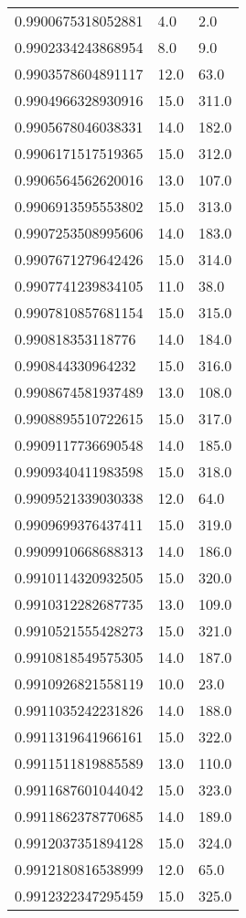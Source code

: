 \begin{center}
\begin{supertabular}[H]{p{0.30\textwidth}p{0.05\textwidth}p{0.05\textwidth}}
0.9900675318052881 & 4.0 & 2.0 \\ 
0.9902334243868954 & 8.0 & 9.0 \\ 
0.9903578604891117 & 12.0 & 63.0 \\ 
0.9904966328930916 & 15.0 & 311.0 \\ 
0.9905678046038331 & 14.0 & 182.0 \\ 
0.9906171517519365 & 15.0 & 312.0 \\ 
0.9906564562620016 & 13.0 & 107.0 \\ 
0.9906913595553802 & 15.0 & 313.0 \\ 
0.9907253508995606 & 14.0 & 183.0 \\ 
0.9907671279642426 & 15.0 & 314.0 \\ 
0.9907741239834105 & 11.0 & 38.0 \\ 
0.9907810857681154 & 15.0 & 315.0 \\ 
0.990818353118776 & 14.0 & 184.0 \\ 
0.990844330964232 & 15.0 & 316.0 \\ 
0.9908674581937489 & 13.0 & 108.0 \\ 
0.9908895510722615 & 15.0 & 317.0 \\ 
0.9909117736690548 & 14.0 & 185.0 \\ 
0.9909340411983598 & 15.0 & 318.0 \\ 
0.9909521339030338 & 12.0 & 64.0 \\ 
0.9909699376437411 & 15.0 & 319.0 \\ 
0.9909910668688313 & 14.0 & 186.0 \\ 
0.9910114320932505 & 15.0 & 320.0 \\ 
0.9910312282687735 & 13.0 & 109.0 \\ 
0.9910521555428273 & 15.0 & 321.0 \\ 
0.9910818549575305 & 14.0 & 187.0 \\ 
0.9910926821558119 & 10.0 & 23.0 \\ 
0.9911035242231826 & 14.0 & 188.0 \\ 
0.9911319641966161 & 15.0 & 322.0 \\ 
0.9911511819885589 & 13.0 & 110.0 \\ 
0.9911687601044042 & 15.0 & 323.0 \\ 
0.9911862378770685 & 14.0 & 189.0 \\ 
0.9912037351894128 & 15.0 & 324.0 \\ 
0.9912180816538999 & 12.0 & 65.0 \\ 
0.9912322347295459 & 15.0 & 325.0 \\ 

\end{supertabular}
\end{center}
